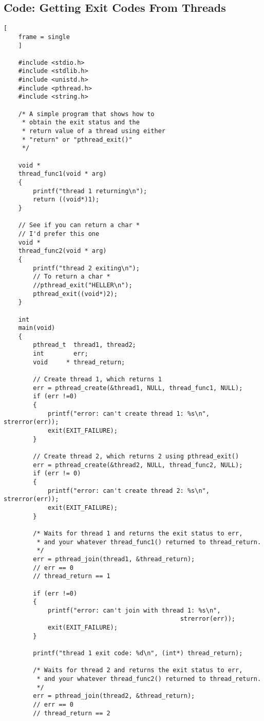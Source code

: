 \documentclass{article}
\begin{document}
\subsection{Code: Getting Exit Codes From Threads}
\begin{lstlisting}[
    frame = single
    ]

    #include <stdio.h>
    #include <stdlib.h>
    #include <unistd.h>
    #include <pthread.h>
    #include <string.h>

    /* A simple program that shows how to
     * obtain the exit status and the 
     * return value of a thread using either
     * "return" or "pthread_exit()"
     */

    void *
    thread_func1(void * arg)
    {
        printf("thread 1 returning\n");
        return ((void*)1);
    }

    // See if you can return a char *
    // I'd prefer this one
    void *
    thread_func2(void * arg)
    {
        printf("thread 2 exiting\n");
        // To return a char *
        //pthread_exit("HELLER\n");
        pthread_exit((void*)2);
    }

    int
    main(void)
    {
        pthread_t  thread1, thread2;
        int 	   err;
        void 	 * thread_return;

        // Create thread 1, which returns 1
        err = pthread_create(&thread1, NULL, thread_func1, NULL);
        if (err !=0)
        {
            printf("error: can't create thread 1: %s\n", strerror(err));
            exit(EXIT_FAILURE);
        }

        // Create thread 2, which returns 2 using pthread_exit()
        err = pthread_create(&thread2, NULL, thread_func2, NULL);
        if (err != 0)
        {
            printf("error: can't create thread 2: %s\n", strerror(err));
            exit(EXIT_FAILURE);
        }

        /* Waits for thread 1 and returns the exit status to err, 
         * and your whatever thread_func1() returned to thread_return.
         */
        err = pthread_join(thread1, &thread_return);
        // err == 0
        // thread_return == 1

        if (err !=0)
        {
            printf("error: can't join with thread 1: %s\n", 
                                                strerror(err));
            exit(EXIT_FAILURE);
        }

        printf("thread 1 exit code: %d\n", (int*) thread_return);

        /* Waits for thread 2 and returns the exit status to err, 
         * and your whatever thread_func2() returned to thread_return.
         */
        err = pthread_join(thread2, &thread_return);
        // err == 0
        // thread_return == 2


\end{lstlisting}
\end{document}
